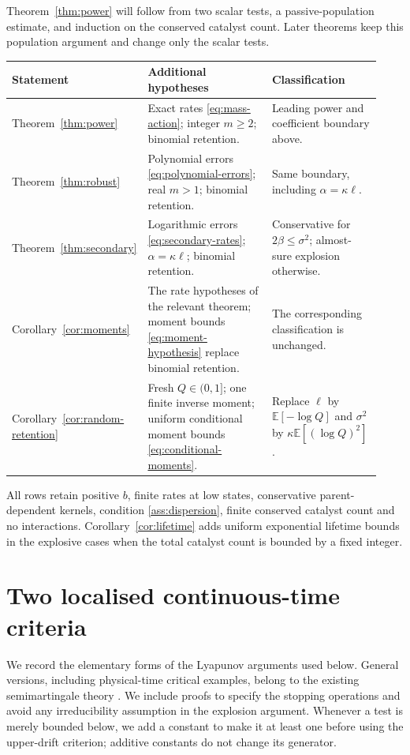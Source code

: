 \documentclass[11pt,a4paper]{article}
\theoremstyle{remark}\newtheorem{remark}[theorem]{Remark}
\newcommand{\E}{\mathbb E}
\begin{document}
Theorem~\ref{thm:power} will follow from two scalar tests, a passive-population estimate, and induction on the conserved catalyst count. Later theorems keep this population argument and change only the scalar tests.

\begin{center}
\begin{tabular}{@{}p{0.19\linewidth}p{0.41\linewidth}p{0.33\linewidth}@{}}
\toprule
Statement & Additional hypotheses & Classification\\
\midrule
Theorem~\ref{thm:power}
& Exact rates \eqref{eq:mass-action}; integer $m\ge2$; binomial retention.
& Leading power and coefficient boundary above.\\[5pt]
Theorem~\ref{thm:robust}
& Polynomial errors \eqref{eq:polynomial-errors}; real $m>1$; binomial retention.
& Same boundary, including $\alpha=\kappa\ell$.\\[5pt]
Theorem~\ref{thm:secondary}
& Logarithmic errors \eqref{eq:secondary-rates}; $\alpha=\kappa\ell$; binomial retention.
& Conservative for $2\beta\le\sigma^2$; almost-sure explosion otherwise.\\[5pt]
Corollary~\ref{cor:moments}
& The rate hypotheses of the relevant theorem; moment bounds \eqref{eq:moment-hypothesis} replace binomial retention.
& The corresponding classification is unchanged.\\[5pt]
Corollary~\ref{cor:random-retention}
& Fresh $Q\in(0,1]$; one finite inverse moment; uniform conditional moment bounds \eqref{eq:conditional-moments}.
& Replace $\ell$ by $\E[-\log Q]$ and $\sigma^2$ by $\kappa\E[(\log Q)^2]$.\\
\bottomrule
\end{tabular}
\end{center}
All rows retain positive $b$, finite rates at low states, conservative parent-dependent kernels, condition \ref{ass:dispersion}, finite conserved catalyst count and no interactions. Corollary~\ref{cor:lifetime} adds uniform exponential lifetime bounds in the explosive cases when the total catalyst count is bounded by a fixed integer.

\section{Two localised continuous-time criteria}\label{sec:criteria}

We record the elementary forms of the Lyapunov arguments used below. General versions, including physical-time critical examples, belong to the existing semimartingale theory \cite{menshikov2014}. We include proofs to specify the stopping operations and avoid any irreducibility assumption in the explosion argument. Whenever a test is merely bounded below, we add a constant to make it at least one before using the upper-drift criterion; additive constants do not change its generator.
\end{document}
